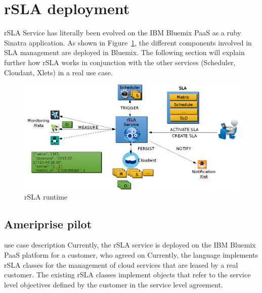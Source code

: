 \section{rSLA deployment }

rSLA Service has literally been evolved on the IBM Bluemix PaaS as a ruby Sinatra application. As shown in Figure~\ref{fig:runtime}, the different components involved in SLA 
management are deployed in Bluemix. The following section will explain further how rSLA works in conjunction with the other services (Scheduler, Cloudant, Xlets) in a real use 
case. 



\begin{figure}[H]
\centering
\includegraphics[width=\textwidth]{pics/runtime.png}
\caption{\label{fig:runtime} rSLA runtime}
\end{figure}


\subsection{Ameriprise pilot}
use case description
Currently, the rSLA service is deployed on the IBM Bluemix PaaS platform for a customer, who agreed on 
Currently, the language implements rSLA classes for the management of cloud services that are leased by a real customer. The existing rSLA classes implement objects that refer to the service level objectives defined by the customer in the service level agreement. 


